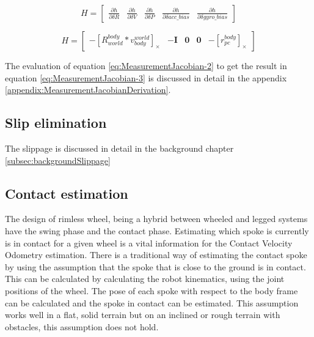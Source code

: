 \documentclass[report.tex]{subfiles}
\begin{document}
        
        \begin{equation}
            H = \begin{bmatrix}
            \frac{\partial h}{\partial \delta R} & \frac{\partial h}{\partial \delta V} & \frac{\partial h}{\partial \delta P} & \frac{\partial h}{\partial \delta acc\_bias} & \frac{\partial h}{\partial \delta gyro\_bias}
            \end{bmatrix}
            \label{eq:MeasurementJacobian-2}
        \end{equation}
        
        \begin{equation}
            H = \begin{bmatrix}
                -[R_{world}^{body} * v_{body}^{world}]_\times & -\mathbf{I} & \mathbf{0} & \mathbf{0} & -[r_{pc}^{body}]_\times
            \end{bmatrix}
            \label{eq:MeasurementJacobian-3}      
        \end{equation}
       
        The evaluation of equation \ref{eq:MeasurementJacobian-2} to get the result in equation \ref{eq:MeasurementJacobian-3} is discussed in detail in the appendix \ref{appendix:MeasurementJacobianDerivation}.

    \subsection{Slip elimination}
    
    The slippage is discussed in detail in the background chapter \ref{subsec:backgroundSlippage}
    
    \subsection{Contact estimation}
    
    The design of rimless wheel, being a hybrid between wheeled and legged systems have the swing phase and the contact phase. Estimating which spoke is currently is in contact for a given wheel is a vital information for the Contact Velocity Odometry estimation. There is a traditional way of estimating the contact spoke by using the assumption that the spoke that is close to the ground is in contact. This can be calculated by calculating the robot kinematics, using the joint positions of the wheel. The pose of each spoke with respect to the body frame can be calculated and the spoke in contact can be estimated. This assumption works well in a flat, solid terrain but on an inclined or rough terrain with obstacles, this assumption does not hold. 
    
\end{document}
